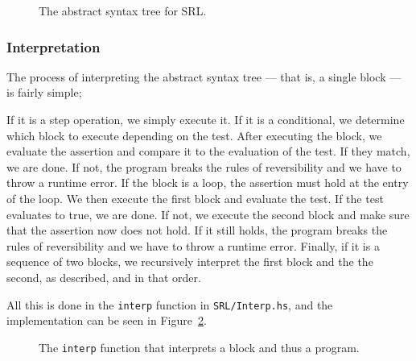 \begin{figure}[H]
  
  \caption{The abstract syntax tree for SRL.}\label{fig:srlast}
\end{figure}


\subsubsection{Interpretation}

The process of interpreting the abstract syntax tree --- that is, a single block --- is fairly simple;

If it is a step operation, we simply execute it.
If it is a conditional, we determine which block to execute depending on the test. After executing the block, we evaluate the assertion and compare it to the evaluation of the test. If they match, we are done. If not, the program breaks the rules of reversibility and we have to throw a runtime error.
If the block is a loop, the assertion must hold at the entry of the loop. We then execute the first block and evaluate the test. If the test evaluates to true, we are done. If not, we execute the second block and make sure that the assertion now does not hold. If it still holds, the program breaks the rules of reversibility and we have to throw a runtime error. Finally, if it is a sequence of two blocks, we recursively interpret the first block and the the second, as described, and in that order.

All this is done in the \texttt{interp} function in \texttt{SRL/Interp.hs}, and the implementation can be seen in Figure~\ref{fig:srlinterp}.

\begin{figure}[H]
  
  \caption{The \texttt{interp} function that interprets a block and thus a program.}\label{fig:srlinterp}
\end{figure}
